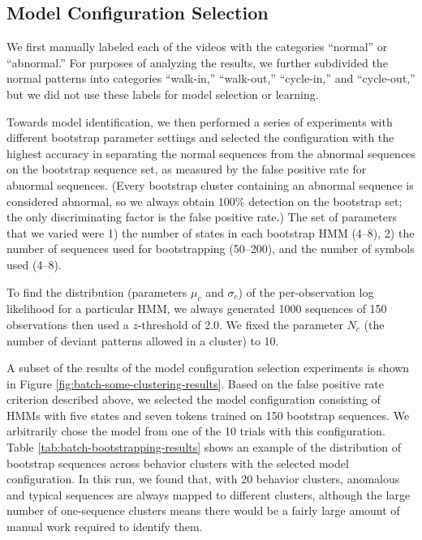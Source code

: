 \subsection{Model Configuration Selection}
\label{sec:batch-model-config}

We first manually labeled each of the videos with the categories
``normal'' or ``abnormal.''  For purposes of analyzing the results, we
further subdivided the normal patterns into categories ``walk-in,''
``walk-out,'' ``cycle-in,'' and ``cycle-out,'' but we did not use
these labels for model selection or learning.

Towards model identification, we then performed a series of
experiments with different bootstrap parameter settings and selected
the configuration with the highest accuracy in separating the normal
sequences from the abnormal sequences on the bootstrap sequence set,
as measured by the false positive rate for abnormal sequences.  (Every
bootstrap cluster containing an abnormal sequence is considered
abnormal, so we always obtain 100\% detection on the bootstrap set;
the only discriminating factor is the false positive rate.)  The set
of parameters that we varied were 1) the number of states in each
bootstrap HMM (4--8), 2) the number of sequences used for
bootstrapping (50--200), and the number of symbols used (4--8).

To find the distribution (parameters $\mu_c$ and $\sigma_c$) of the
per-observation log likelihood for a particular HMM, we always
generated 1000 sequences of 150 observations then used a $z$-threshold
of 2.0. We fixed the parameter $N_c$ (the number of deviant patterns
allowed in a cluster) to 10.

A subset of the results of the model configuration selection
experiments is shown in
Figure \ref{fig:batch-some-clustering-results}. Based on the false
positive rate criterion described above, we selected the model
configuration consisting of HMMs with five states and seven tokens
trained on 150 bootstrap sequences.  We arbitrarily chose the model
from one of the 10 trials with this configuration.
Table \ref{tab:batch-bootstrapping-results} shows an example of the
distribution of bootstrap sequences across behavior clusters with the
selected model configuration. In this run, we found that, with 20 behavior 
clusters, anomalous and typical sequences are always mapped to 
different clusters, although the large number of one-sequence 
clusters means there would be a fairly large amount of manual 
work required to identify them.

